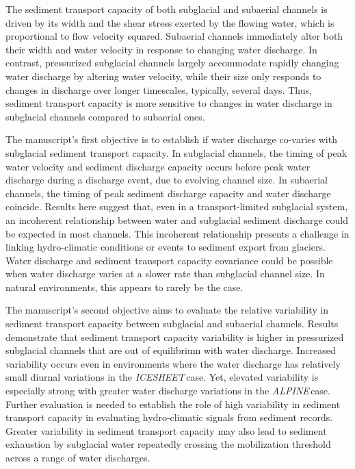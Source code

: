 \documentclass[tc, manuscript]{copernicus}
\newcommand{\alpine}{\textit{ALPINE}\,}
\newcommand{\icesheet}{\textit{ICESHEET}\,}
\begin{document}
\conclusions

The sediment transport capacity of both subglacial and subaerial channels is driven by its width and the shear stress exerted by the flowing water, which is proportional to flow velocity squared.
Subaerial channels immediately alter both their width and water velocity in response to changing water discharge.
In contrast, pressurized subglacial channels largely accommodate rapidly changing water discharge by altering water velocity, while their size only responds to changes in discharge over longer timescales, typically, several days.
Thus, sediment transport capacity is more sensitive to changes in water discharge in subglacial channels compared to subaerial ones.

The manuscript's first objective is to establish if water discharge co-varies with subglacial sediment transport capacity.
In subglacial channels, the timing of peak water velocity and sediment discharge capacity occurs before peak water discharge during a discharge event, due to evolving channel size.
In subaerial channels, the timing of peak sediment discharge capacity and water discharge coincide.
Results here suggest that, even in a transport-limited subglacial system, an incoherent relationship between water and subglacial sediment discharge could be expected in most channels.
This incoherent relationship presents a challenge in linking hydro-climatic conditions or events to sediment export from glaciers.
Water discharge and sediment transport capacity covariance could be possible when water discharge varies at a slower rate than subglacial channel size.
In natural environments, this appears to rarely be the case.

The manuscript's second objective aims to evaluate the relative variability in sediment transport capacity between subglacial and subaerial channels.
Results demonstrate that sediment transport capacity variability is higher in pressurized subglacial channels that are out of equilibrium with water discharge.
Increased variability occurs even in environments where the water discharge has relatively small diurnal variations in the \icesheet case.
Yet, elevated variability is especially strong with greater water discharge variations in the \alpine case.
Further evaluation is needed to establish the role of high variability in sediment transport capacity in evaluating hydro-climatic signals from sediment records.
Greater variability in sediment transport capacity may also lead to sediment exhaustion by subglacial water repeatedly crossing the mobilization threshold across a range of water discharges. 
\end{document}
